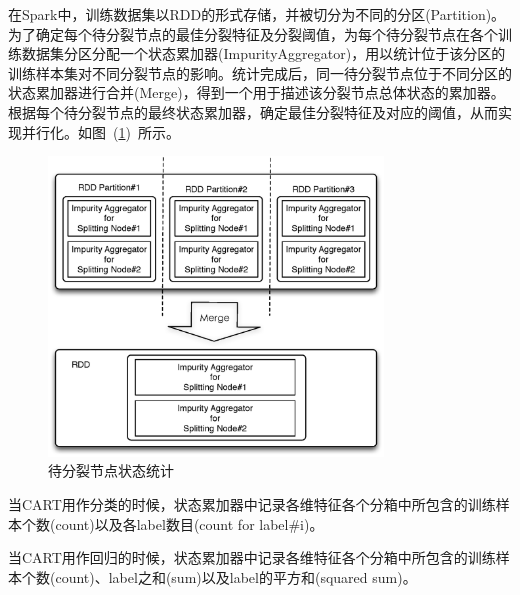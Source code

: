 \documentclass[a4paper,11pt,         %
               ]{article}
\begin{document}
在Spark中，训练数据集以RDD的形式存储，并被切分为不同的分区(Partition)。为了确定每个待分裂节点的最佳分裂特征及分裂阈值，为每个待分裂节点在各个训练数据集分区分配一个状态累加器(ImpurityAggregator)，用以统计位于该分区的训练样本集对不同分裂节点的影响。统计完成后，同一待分裂节点位于不同分区的状态累加器进行合并(Merge)，得到一个用于描述该分裂节点总体状态的累加器。根据每个待分裂节点的最终状态累加器，确定最佳分裂特征及对应的阈值，从而实现并行化。如图~(\ref{fig:aggregator})~所示。

\begin{figure}[htbp]
\centering\includegraphics[width=3.5in]{img/aggregator.eps}
\caption{待分裂节点状态统计}\label{fig:aggregator}
\end{figure}


当CART用作分类的时候，状态累加器中记录各维特征各个分箱中所包含的训练样本个数(count)以及各label数目(count for label\#i)。

当CART用作回归的时候，状态累加器中记录各维特征各个分箱中所包含的训练样本个数(count)、label之和(sum)以及label的平方和(squared sum)。


\end{document}
